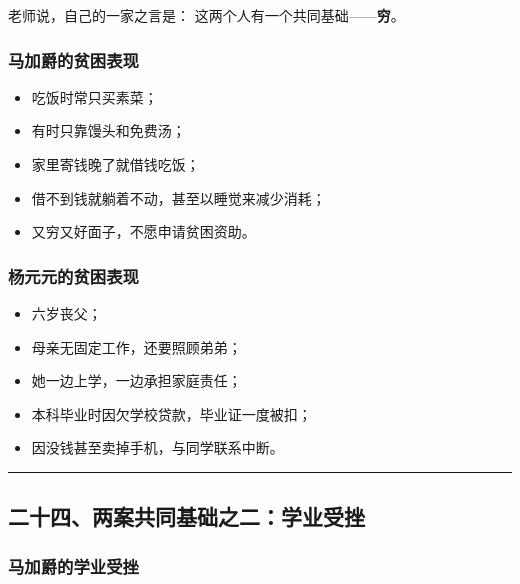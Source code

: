\documentclass[
  chinese,
  9pt,
  a4paper,
]{ctexart}
\providecommand{\tightlist}{%
  \setlength{\itemsep}{0pt}\setlength{\parskip}{0pt}}
\begin{document}
老师说，自己的一家之言是： 这两个人有一个共同基础------\textbf{穷}。

\subsubsection{马加爵的贫困表现}\label{ux9a6cux52a0ux7235ux7684ux8d2bux56f0ux8868ux73b0}

\begin{itemize}
\tightlist
\item
  吃饭时常只买素菜；
\item
  有时只靠馒头和免费汤；
\item
  家里寄钱晚了就借钱吃饭；
\item
  借不到钱就躺着不动，甚至以睡觉来减少消耗；
\item
  又穷又好面子，不愿申请贫困资助。
\end{itemize}

\subsubsection{杨元元的贫困表现}\label{ux6768ux5143ux5143ux7684ux8d2bux56f0ux8868ux73b0}

\begin{itemize}
\tightlist
\item
  六岁丧父；
\item
  母亲无固定工作，还要照顾弟弟；
\item
  她一边上学，一边承担家庭责任；
\item
  本科毕业时因欠学校贷款，毕业证一度被扣；
\item
  因没钱甚至卖掉手机，与同学联系中断。
\end{itemize}

\begin{center}\rule{0.5\linewidth}{0.5pt}\end{center}

\subsection{二十四、两案共同基础之二：学业受挫}\label{ux4e8cux5341ux56dbux4e24ux6848ux5171ux540cux57faux7840ux4e4bux4e8cux5b66ux4e1aux53d7ux632b}

\subsubsection{马加爵的学业受挫}\label{ux9a6cux52a0ux7235ux7684ux5b66ux4e1aux53d7ux632b}
\end{document}
